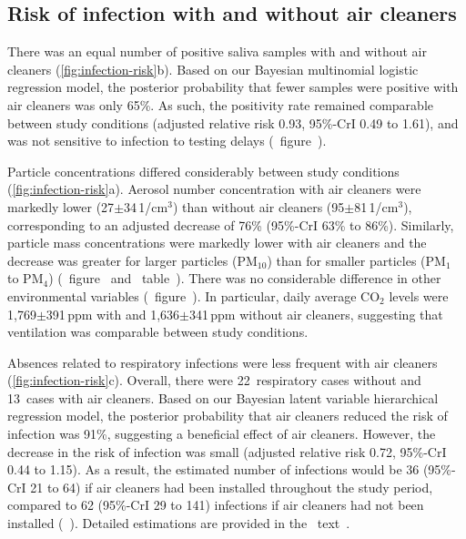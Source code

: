 \documentclass[fleqn,11pt]{wlscirep}
\begin{document}
\subsection{Risk of infection with and without air cleaners}

There was an equal number of positive saliva samples with and without air cleaners (\cref{fig:infection-risk}b). Based on our Bayesian multinomial logistic regression model, the posterior probability that fewer samples were positive with air cleaners was only 65\%. As such, the positivity rate remained comparable between study conditions (adjusted relative risk 0.93, 95\%-CrI 0.49 to 1.61), and was not sensitive to infection to testing delays (\supp~figure~).

Particle concentrations differed considerably between study conditions (\cref{fig:infection-risk}a). Aerosol number concentration with air cleaners were markedly lower (27$\pm$34\,1/cm$^3$) than without air cleaners (95$\pm$81\,1/cm$^3$), corresponding to an adjusted decrease of 76\% (95\%-CrI 63\% to 86\%). Similarly, particle mass concentrations were markedly lower with air cleaners and the decrease was greater for larger particles (PM$_{10}$) than for smaller particles (PM$_1$ to PM$_{4}$) (\supp~figure~ and \supp~table~). There was no considerable difference in other environmental variables (\supp~figure~). In particular, daily average CO$_2$ levels were 1,769$\pm$391\,ppm with and 1,636$\pm$341\,ppm without air cleaners, suggesting that ventilation was comparable between study conditions.

Absences related to respiratory infections were less frequent with air cleaners (\cref{fig:infection-risk}c). Overall, there were 22~respiratory cases without and 13~cases with air cleaners. Based on our Bayesian latent variable hierarchical regression model, the posterior probability that air cleaners reduced the risk of infection was 91\%, suggesting a beneficial effect of air cleaners. However, the decrease in the risk of infection was small (adjusted relative risk 0.72, 95\%-CrI 0.44 to 1.15). As a result, the estimated number of infections would be 36 (95\%-CrI 21 to 64) if air cleaners had been installed throughout the study period, compared to 62 (95\%-CrI 29 to 141) infections if air cleaners had not been installed (\supp~). Detailed estimations are provided in the \supp~text~. 
\end{document}
